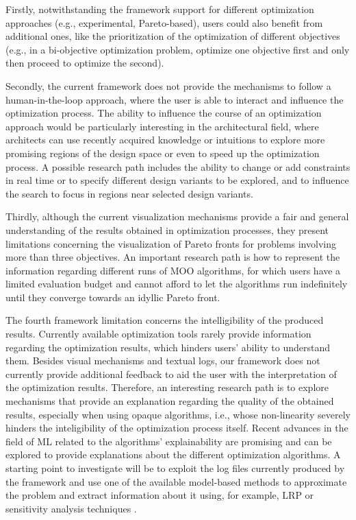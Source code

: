 Firstly, notwithstanding the framework support for different optimization approaches (e.g., experimental, Pareto-based), users could also benefit from additional ones, like the prioritization of the optimization of different objectives (e.g., in a bi-objective optimization problem, optimize one objective first and only then proceed to optimize the second). 

Secondly, the current framework does not provide the mechanisms to follow a human-in-the-loop approach, where the user is able to interact and influence the optimization process. The ability to influence the course of an optimization approach would be particularly interesting in the architectural field, where architects can use recently acquired knowledge or intuitions to explore more promising regions of the design space or even to speed up the optimization process. A possible research path includes the ability to change or add constraints in real time or to specify different design variants to be explored, and to influence the search to focus in regions near selected design variants. %

Thirdly, although the current visualization mechanisms provide a fair and general understanding of the results obtained in optimization processes, they present limitations concerning the visualization of Pareto fronts for problems involving more than three objectives. An important research path is how to represent the information regarding different runs of \ac{MOO} algorithms, for which users have a limited evaluation budget and cannot afford to let the algorithms run indefinitely until they converge towards an idyllic Pareto front. %

The fourth framework limitation concerns the intelligibility of the produced results. Currently available optimization tools rarely provide information regarding the optimization results, which hinders users' ability to understand them. Besides visual mechanisms and textual logs, our framework does not currently provide additional feedback to aid the user with the interpretation of the optimization results. Therefore, an interesting research path is to explore mechanisms that provide an explanation regarding the quality of the obtained results, especially when using opaque algorithms, i.e., whose non-linearity severely hinders the inteligibility of the optimization process itself. Recent advances in the field of \ac{ML} related to the algorithms' explainability are promising and can be explored to provide explanations about the different optimization algorithms. A starting point to investigate will be to exploit the log files currently produced by the framework and use one of the available model-based methods to approximate the problem and extract information about it using, for example, LRP or sensitivity analysis techniques \cite{Bach2015,Tripathy2018}.

